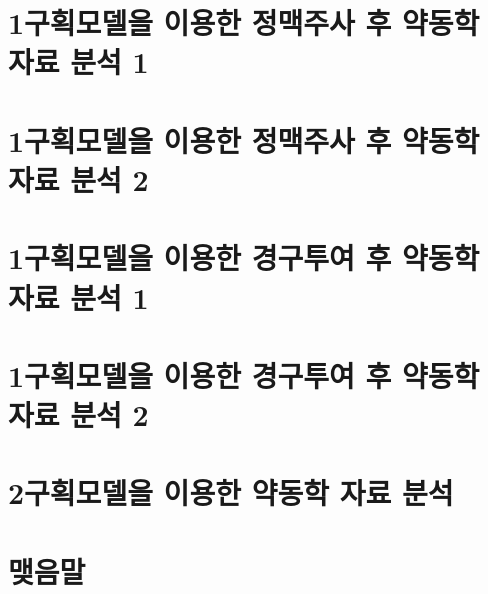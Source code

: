 \documentclass[
  11pt,
  krantz2, a4paper, twoside]{krantz}
\begin{document}
\hypertarget{uxad6cuxd68duxbaa8uxb378uxc744-uxc774uxc6a9uxd55c-uxc815uxb9e5uxc8fcuxc0ac-uxd6c4-uxc57duxb3d9uxd559-uxc790uxb8cc-uxbd84uxc11d-1}{%
\section{1구획모델을 이용한 정맥주사 후 약동학 자료 분석 1}\label{uxad6cuxd68duxbaa8uxb378uxc744-uxc774uxc6a9uxd55c-uxc815uxb9e5uxc8fcuxc0ac-uxd6c4-uxc57duxb3d9uxd559-uxc790uxb8cc-uxbd84uxc11d-1}}

\hypertarget{uxad6cuxd68duxbaa8uxb378uxc744-uxc774uxc6a9uxd55c-uxc815uxb9e5uxc8fcuxc0ac-uxd6c4-uxc57duxb3d9uxd559-uxc790uxb8cc-uxbd84uxc11d-2}{%
\section{1구획모델을 이용한 정맥주사 후 약동학 자료 분석 2}\label{uxad6cuxd68duxbaa8uxb378uxc744-uxc774uxc6a9uxd55c-uxc815uxb9e5uxc8fcuxc0ac-uxd6c4-uxc57duxb3d9uxd559-uxc790uxb8cc-uxbd84uxc11d-2}}

\hypertarget{uxad6cuxd68duxbaa8uxb378uxc744-uxc774uxc6a9uxd55c-uxacbduxad6cuxd22cuxc5ec-uxd6c4-uxc57duxb3d9uxd559-uxc790uxb8cc-uxbd84uxc11d-1}{%
\section{1구획모델을 이용한 경구투여 후 약동학 자료 분석 1}\label{uxad6cuxd68duxbaa8uxb378uxc744-uxc774uxc6a9uxd55c-uxacbduxad6cuxd22cuxc5ec-uxd6c4-uxc57duxb3d9uxd559-uxc790uxb8cc-uxbd84uxc11d-1}}

\hypertarget{uxad6cuxd68duxbaa8uxb378uxc744-uxc774uxc6a9uxd55c-uxacbduxad6cuxd22cuxc5ec-uxd6c4-uxc57duxb3d9uxd559-uxc790uxb8cc-uxbd84uxc11d-2}{%
\section{1구획모델을 이용한 경구투여 후 약동학 자료 분석 2}\label{uxad6cuxd68duxbaa8uxb378uxc744-uxc774uxc6a9uxd55c-uxacbduxad6cuxd22cuxc5ec-uxd6c4-uxc57duxb3d9uxd559-uxc790uxb8cc-uxbd84uxc11d-2}}

\hypertarget{uxad6cuxd68duxbaa8uxb378uxc744-uxc774uxc6a9uxd55c-uxc57duxb3d9uxd559-uxc790uxb8cc-uxbd84uxc11d}{%
\section{2구획모델을 이용한 약동학 자료 분석}\label{uxad6cuxd68duxbaa8uxb378uxc744-uxc774uxc6a9uxd55c-uxc57duxb3d9uxd559-uxc790uxb8cc-uxbd84uxc11d}}

\hypertarget{uxb9fauxc74cuxb9d0-4}{%
\section{맺음말}\label{uxb9fauxc74cuxb9d0-4}}

\printindex
\end{document}
